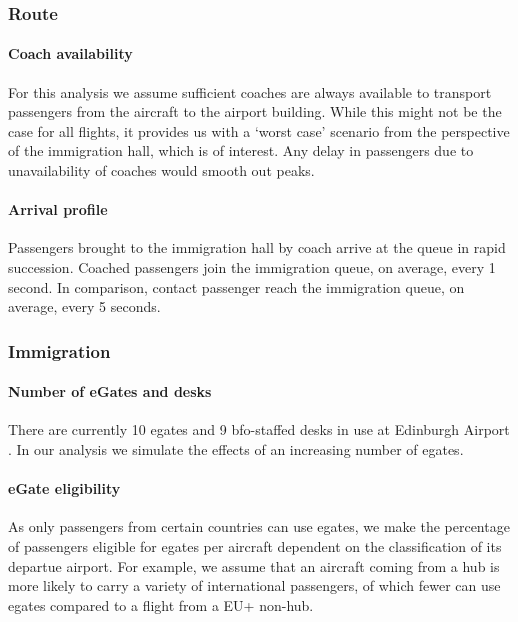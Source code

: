\documentclass[10pt]{article}
\begin{document}
\subsubsection{Route}

\paragraph{Coach availability}
For this analysis we assume sufficient coaches are always available to transport passengers from the aircraft to the airport building. While this might not be the case for all flights, it provides us with a `worst case' scenario from the perspective of the immigration hall, which is of interest. Any delay in passengers due to unavailability of coaches would smooth out peaks.

\paragraph{Arrival profile} 
 Passengers brought to the immigration hall by coach arrive at the queue in rapid succession. Coached passengers join the immigration queue, on average, every 1 second. In comparison, contact passenger reach the immigration queue, on average, every 5 seconds.



\subsubsection{Immigration} \label{subsec:choices_immigration}

\paragraph{Number of eGates and desks} There are currently 10 \glspl{egate} and 9 \gls{bfo}-staffed desks in use at Edinburgh Airport \cite{modelling_competition}. In our analysis we simulate the effects of an increasing number of \glspl{egate}.

\paragraph{eGate eligibility}
As only passengers from certain countries can use \glspl{egate}, we make the percentage of passengers eligible for \glspl{egate} per aircraft dependent on the classification of its departue airport. For example, we assume that an aircraft coming from a hub is more likely to carry a variety of international passengers, of which fewer can use \glspl{egate} compared to a flight from a EU+ non-hub. 
\end{document}
